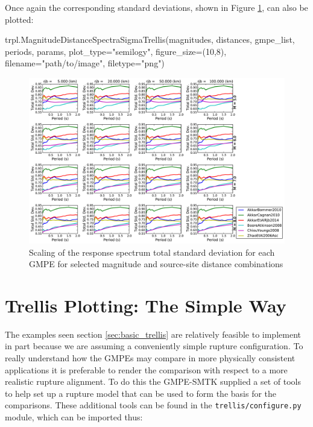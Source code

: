 Once again the corresponding standard deviations, shown in Figure \ref{fig:spectra_sigma_simple_trellis}, can also be plotted:
\begin{python}
trpl.MagnitudeDistanceSpectraSigmaTrellis(magnitudes,
                                          distances,
                                          gmpe_list,
                                          periods,
                                          params,
                                          plot_type="semilogy",
                                          figure_size=(10,8),
                                          filename="path/to/image",
                                          filetype="png")
\end{python}
\begin{figure}[htbp]
	\centering
		\includegraphics[width=\textwidth]{./figures/trellis/spectra_total_sigma_trellis_simple.pdf}
	\caption{Scaling of the response spectrum total standard deviation for each GMPE for selected magnitude and source-site distance combinations}
	\label{fig:spectra_sigma_simple_trellis}
\end{figure}

\section{Trellis Plotting: The Simple Way}
\label{sec:rupture_trellis}

The examples seen section \ref{sec:basic_trellis} are relatively feasible to implement in part because we are assuming a conveniently simple rupture configuration. To really understand how the GMPEs may compare in more physically consistent applications it is preferable to render the comparison with respect to a more realistic rupture alignment. To do this the GMPE-SMTK supplied a set of tools to help set up a rupture model that can be used to form the basis for the comparisons. These additional tools can be found in the \verb=trellis/configure.py= module, which can be imported thus:

